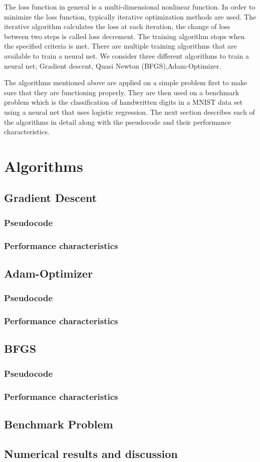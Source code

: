 \documentclass[10pt,twocolumn]{article}
\begin{document}
The loss function in general is a multi-dimensional nonlinear function. In order to minimize the loss function, typically iterative optimization methods are used. The iterative algorithm calculates the loss at each iteration, the change of loss between two steps is called loss decrement. The training algorithm stops when the specified criteria is met. There are multiple training algorithms that are available to train a neural net. We consider three  different algorithms to train a neural net; Gradient descent, Quasi Newton (BFGS),Adam-Optimizer.

The algorithms mentioned above are applied on a simple problem first to make sure that they are functioning properly. They are then used on a benchmark problem which is the classification of handwritten digits in a MNIST data set using a neural net that uses logistic regression. The next section describes each of the algorithms in detail along with the pseudocode and their performance characteristics. 

\section{Algorithms}


\subsection{Gradient Descent}
\subsubsection{Pseudocode}
\subsubsection{Performance characteristics}


\subsection{Adam-Optimizer}
\subsubsection{Pseudocode}
\subsubsection{Performance characteristics}

\subsection{BFGS}
\subsubsection{Pseudocode}
\subsubsection{Performance characteristics}


\subsection{Benchmark Problem}

\subsection{Numerical results and discussion}





\end{document}

